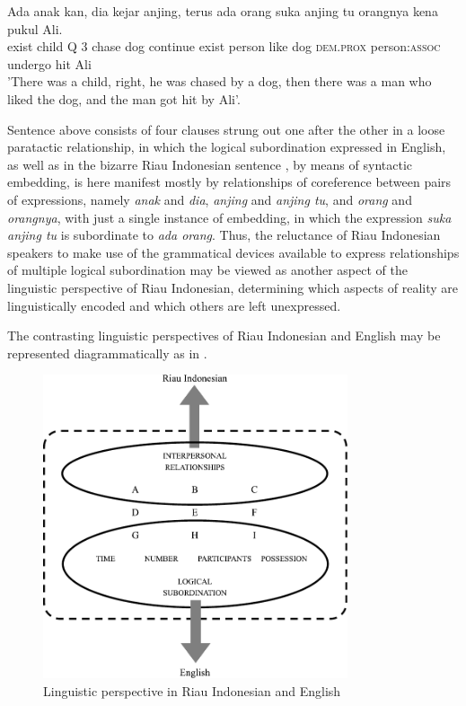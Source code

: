 \documentclass[output=paper]{langscibook}
\begin{document}
\ea \label{ex:gil:9}
\gll Ada	anak	kan,	dia	kejar	anjing,	terus	ada	orang	suka	anjing	tu orangnya	kena	pukul	Ali. \\
    exist	child	Q	3	chase	dog	continue	exist	person	like	dog \textsc{dem.prox} person:\textsc{assoc}	undergo	hit	Ali\\
\glt 		'There was a child, right, he was chased by a dog, then there was a man who liked the dog, and the man got hit by Ali'.
\z

Sentence  above consists of four clauses strung out one after the other in a loose paratactic relationship, in which the logical subordination expressed in English, as well as in the bizarre Riau Indonesian sentence , by means of syntactic embedding, is here manifest mostly by relationships of coreference between pairs of expressions, namely \textit{anak} and \textit{dia}, \textit{anjing} and \textit{anjing tu}, and \textit{orang} and \textit{orangnya}, with just a single instance of embedding, in which the expression \textit{suka anjing tu} is subordinate to \textit{ada orang}.  Thus, the reluctance of Riau Indonesian speakers to make use of the grammatical devices available to express relationships of multiple logical subordination may be viewed as another aspect of the linguistic perspective of Riau Indonesian, determining which aspects of reality are linguistically encoded and which others are left unexpressed.

The contrasting linguistic perspectives of Riau Indonesian and English may be represented diagrammatically as in .

\begin{figure}
\centering
\includegraphics[width=0.8\textwidth]{gil_figure4.pdf}
\caption{\label{fig:gil:fig4}Linguistic perspective in Riau Indonesian and English}
\end{figure}
\end{document}
